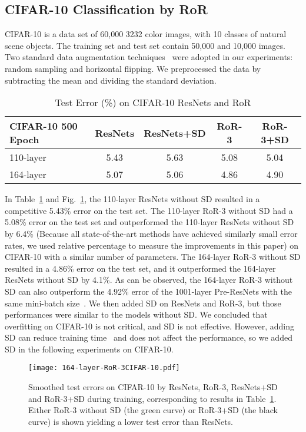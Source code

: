 \documentclass[journal]{IEEEtran}
\begin{document}
\subsection{CIFAR-10 Classification by RoR}
CIFAR-10 is a data set of 60,000 3232 color images, with 10 classes of natural scene objects. The training set and test set contain 50,000 and 10,000 images. Two standard data augmentation techniques~\cite{he2015resnets,he2016preresnets,zagoruyko2016wrn,huang2016SD} were adopted in our experiments: random sampling and horizontal flipping. We preprocessed the data by subtracting the mean and dividing the standard deviation.
\begin{table}[!t]
\renewcommand{\arraystretch}{1.3}
\caption{Test Error (\%) on CIFAR-10 ResNets and RoR}
\label{tab:cifar10RoR}
\centering
\begin{tabular}{|l|c|c|c|c|}
\hline
CIFAR-10 500 Epoch           &ResNets             &ResNets+SD  &RoR-3    &RoR-3+SD  \\ \hline\hline
110-layer                    &5.43                &5.63        &5.08     &5.04    \\\hline
164-layer                    &5.07                &5.06        &4.86     &4.90    \\\hline
\end{tabular}
\end{table}
\par 
In Table~\ref{tab:cifar10RoR} and Fig.~\ref{fig:RoR-310}, the 110-layer ResNets without SD resulted in a competitive 5.43\% error on the test set. The 110-layer RoR-3 without SD had a 5.08\% error on the test set and outperformed the 110-layer ResNets without SD by 6.4\% (Because all state-of-the-art methods have achieved similarly small error rates, we used relative percentage to measure the improvements in this paper) on CIFAR-10 with a similar number of parameters. The 164-layer RoR-3 without SD resulted in a 4.86\% error on the test set, and it outperformed the 164-layer ResNets without SD by 4.1\%. As can be observed, the 164-layer RoR-3 without SD can also outperform the 4.92\% error of the 1001-layer Pre-ResNets with the same mini-batch size~\cite{he2016preresnets}. We then added SD on ResNets and RoR-3, but those performances were similar to the models without SD. We concluded that overfitting on CIFAR-10 is not critical, and SD is not effective. However, adding SD can reduce training time~\cite{huang2016SD} and does not affect the performance, so we added SD in the following experiments on CIFAR-10.
\begin{figure}
\centering
\texttt{[image: 164-layer-RoR-3CIFAR-10.pdf]}
\caption{Smoothed test errors on CIFAR-10 by ResNets, RoR-3, ResNets+SD and RoR-3+SD during training, corresponding to results in Table~\ref{tab:cifar10RoR}. Either RoR-3 without SD (the green curve) or RoR-3+SD (the black curve) is shown yielding a lower test error than ResNets. }
\label{fig:RoR-310}
\end{figure} 
\end{document}
